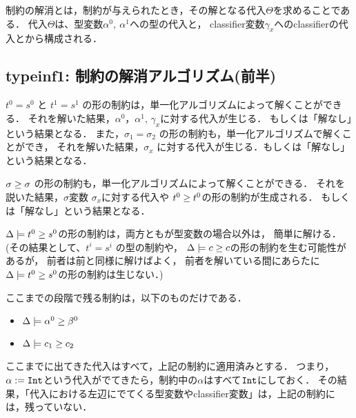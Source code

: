 制約の解消とは，制約が与えられたとき，その解となる代入$\Theta$を求めることである．
代入$\Theta$は、型変数$\alpha^0,~ \alpha^1$への型の代入と，
classifier変数$\gamma_x$へのclassifierの代入とから構成される．



\subsection{typeinf1: 制約の解消アルゴリズム(前半)}
$t^0=s^0$ と $t^1=s^1$ の形の制約は，単一化アルゴリズムによって解くことができる．
それを解いた結果，$\alpha^0$，$\alpha^1$, $\gamma_x$に対する代入が生じる．
もしくは「解なし」という結果となる．
また，$\sigma_1 = \sigma_2$ の形の制約も，単一化アルゴリズムで解くことができ，
それを解いた結果，$\sigma_x$ に対する代入が生じる．もしくは「解なし」という結果となる．

${\sigma} \ge {\sigma}$ の形の制約も，単一化アルゴリズムによって解くことができる．
それを説いた結果，$\sigma$変数 $\sigma_x$に対する代入や ${t^0} \ge {t^0}$の形の制約が生成される．
もしくは「解なし」という結果となる．

$\Delta \models {t^0} \ge {s^0}$の形の制約は，両方ともが型変数の場合以外は，
簡単に解ける．
(その結果として、$t^i=s^i$ の型の制約や，
$\Delta \models {c} \ge {c}$の形の制約を生む可能性があるが，
前者は前と同様に解けばよく，
前者を解いている間にあらたに$\Delta \models {t^0} \ge {s^0}$の形の制約は生じない．)

ここまでの段階で残る制約は，以下のものだけである．

\begin{itemize}
\item $\Delta \models {\alpha^0} \ge {\beta^0}$
\item $\Delta \models {c_1} \ge {c_2}$
\end{itemize}

ここまでに出てきた代入はすべて，上記の制約に適用済みとする．
つまり，$\alpha:=\mbox{\texttt{Int}}$という代入がでてきたら，制約中の$\alpha$はすべて$\mbox{\texttt{Int}}$にしておく．
その結果，「代入における左辺にでてくる型変数やclassifier変数」は，上記の制約には，残っていない．

